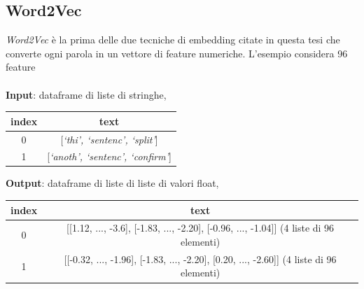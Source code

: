 \documentclass[12pt]{report}
\theoremstyle{definition}
\begin{document}
\subsection{Word2Vec}
\textit{Word2Vec} è la prima delle due tecniche di embedding citate in questa tesi che converte ogni parola in un vettore di feature numeriche.
L'esempio considera 96 feature
\\
\\
\textbf{Input}: dataframe di liste di stringhe,
\begin{center}
    \begin{tabular}{|c|c|}
    \hline
    \textbf{index} & \textbf{text} \\
    \hline
         0 & [\textit{`thi', `sentenc', `split'}]\\
         1 & [\textit{`anoth', `sentenc', `confirm'}]\\
    \hline
    \end{tabular}
\end{center}
\textbf{Output}: dataframe di liste di liste di valori float,
\begin{center}
    \begin{tabular}{|c|c|}
    \hline
    \textbf{index} & \textbf{text} \\
    \hline
         0 & [[1.12, ..., -3.6], [-1.83, ..., -2.20], [-0.96, ..., -1.04]] (4 liste di 96 elementi) \\
         1 & [[-0.32, ..., -1.96], [-1.83, ..., -2.20], [0.20, ..., -2.60]] (4 liste di 96 elementi) \\
    \hline
    \end{tabular}
\end{center}
\end{document}
